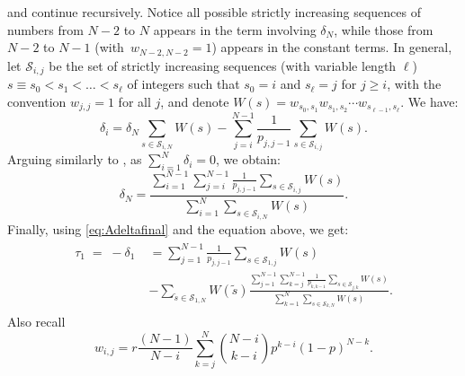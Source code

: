 \documentclass[a4paper,english,10pt]{amsart}
\theoremstyle{definition}
\numberwithin{equation}{section}
\begin{document}
and continue recursively. 
Notice all possible strictly increasing sequences of numbers from $N-2$ to
$N$ appears in the term involving $\delta_N $, while those from $N-2$ to
$N-1$ \mbox{(with $w_{N-2,N-2} = 1$)} appears in the constant terms. In general, let $\mathcal{S}_{i,j}$ be the set of strictly increasing sequences (with variable length $\ell$) $s \equiv 
s_0 < s_1 < \ldots < s_\ell$ 
of integers such that $s_0=i$ and $s_\ell=j$ for $j \geq i$, with the convention $w_{j,j} = 1$ for all $j$, and denote
$W(s) = w_{s_0,s_1}w_{s_1,s_2}\cdots w_{s_{\ell-1}, s_\ell}$.
We have:
\begin{equation}
  \label{eq:Adeltafinal}
\delta_i = \delta_N  \sum_{s\in\mathcal{S}_{i,N}} W(s)  - \sum_{j=i}^{N-1} \frac{1}{p_{j,j-1}} \sum_{s\in\mathcal{S}_{i,j}} W(s).
\end{equation}
Arguing similarly to \cite{AlcaldeGuerberoffLozano2022}, as $\sum_{i=1}^N \delta_i = 0$, we obtain:\begin{equation} \label{eq:deltaN}
  \delta_N = \frac{\sum_{i=1}^{N-1} \sum_{j=i}^{N-1}  \frac{1}{p_{j,j-1}} \sum_{s\in\mathcal{S}_{i,j}} W(s)}{\sum_{i=1}^{N} \sum_{s\in\mathcal{S}_{i,N}} W(s)}.
\end{equation}
Finally, using \eqref{eq:Adeltafinal} and the equation above, we get:
\begin{align} \label{eq:ATbinomial}
\begin{split}
  \tau_1\; = \; - \delta_1 \; & = \sum_{j=1}^{N-1} \frac{1}{p_{j,j-1}} \sum_{s\in\mathcal{S}_{1,j}} W( s) \\  & -  \sum_{\tilde{s} \in \mathcal{S}_{1,N}} W(\tilde{s}) \frac{\sum_{j=1}^{N-1}  \sum_{k=j}^{N-1} \frac{1}{p_{k,k-1}} \sum_{s\in\mathcal{S}_{j,k}}  W(s)}{ \sum_{k=1}^{N}  \sum_{s\in\mathcal{S}_{k,N}} W(s)}.
\end{split}
\end{align}
Also recall 
\[
  w_{i,j} = r\frac{(N-1)}{N-i}
    \sum_{k=j}^N \binom{N-i}{k-i} p^{k-i} (1-p)^{N-k}.
\]
\end{document}
